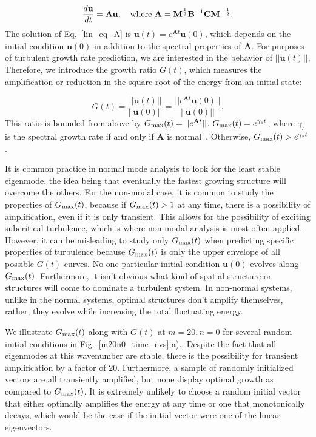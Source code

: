 \documentclass[letter,scriptaddress,twocolumn, prl,showkeys]{revtex4}
\def\beq{\begin{equation}}
\def\eeq{\end{equation}}
\newcommand{\diff}[2]{\frac{d#1}{d#2}}
\begin{document}
\beq
\label{lin_eq_A}
\diff{\mathbf{u}}{t} = \mathbf{A} \mathbf{u},  \quad \rm{where} \ \mathbf{A} = \mathbf{M}^{\frac{1}{2}} \mathbf{B}^{-1} \mathbf{C} \mathbf{M}^{-\frac{1}{2}}.
\eeq
The solution of Eq.~\ref{lin_eq_A} is $\mathbf{u}(t) = e^{\mathbf{A} t} \mathbf{u}(0)$, which
depends on the initial condition $\mathbf{u}(0)$ in addition to the spectral properties of $\mathbf{A}$. For purposes of turbulent growth rate prediction, we are interested in
the behavior of $||\mathbf{u}(t)||$. Therefore, we introduce the growth ratio $G(t)$, which measures the amplification or reduction in the square root of the energy from an initial state:

\beq
\label{g_def}
G(t) = \frac{||\mathbf{u}(t)||}{||\mathbf{u}(0)||} = \frac{||e^{\mathbf{A} t} \mathbf{u}(0)||}{||\mathbf{u}(0)||}.
\eeq
This ratio is bounded from above by $G_{\rm{max}}(t) = ||e^{\mathbf{A} t}||$. $G_{\rm{max}}(t) = e^{\gamma_s t}$, where $\gamma_s$ is the spectral growth rate
if and only if $\mathbf{A}$ is normal~\cite{schmid2007}. Otherwise, $G_{\rm{max}}(t) > e^{\gamma_s t}$. 

It is common practice in normal mode analysis to look for the least stable eigenmode, the idea being that eventually the fastest growing structure will overcome the others.
For the non-modal case, it is common to study the properties of $G_{\rm{max}}(t)$, because if $G_{\rm{max}}(t) > 1$ at any time, there is a possibility of amplification, even if it is only transient.
This allows for the possibility of exciting subcritical turbulence, which is where non-modal analysis is most often applied. 
However, it can be misleading to study only $G_{\rm{max}}(t)$ when predicting specific properties of turbulence because
$G_{\rm{max}}(t)$ is only the upper envelope of all possible $G(t)$ curves. No one particular initial condition $\mathbf{u}(0)$ evolves along $G_{\rm{max}}(t)$. 
Furthermore, it isn't obvious what kind of spatial structure or structures will come to dominate a turbulent system. 
In non-normal systems, unlike in the normal systems, optimal structures don't amplify themselves, rather, they evolve while increasing the total fluctuating energy.

We illustrate $G_{\rm{max}}(t)$ along with $G(t)$ at $m=20, n=0$ for several random initial conditions in Fig.~\ref{m20n0_time_evs} a).. Despite the fact that all eigenmodes at this
wavenumber are stable, there is the possibility for transient amplification by a factor of $20$. Furthermore, a sample of randomly initialized vectors are all transiently amplified, but none display
optimal growth as compared to $G_{\rm{max}}(t)$.
It is extremely unlikely to choose a random initial vector that either optimally amplifies the energy at any time or one that monotonically decays, which would be the case
if the initial vector were one of the linear eigenvectors. 
\end{document}
